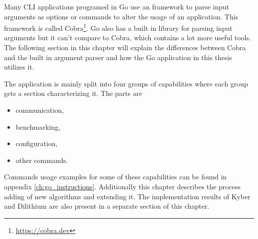 Many CLI applications programed in Go use an framework to parse input arguments as options or commands to alter the usage of an application. This framework is called Cobra\footnote{\url{https://cobra.dev}}. Go also has a built in library for parsing input arguments but it can't compare to Cobra, which contains a lot more useful tools. The following section in this chapter will explain the differences between Cobra and the built in argument parser and how the Go application in this thesis utilizes it.

The application is mainly split into four groups of capabilities where each group gets a section characterizing it. The parts are
\begin{itemize}
  \item communication,
  \item benchmarking,
  \item configuration,
  \item other commands.
\end{itemize}
\noindent Commands usage examples for some of these capabilities can be found in appendix \ref{ch:go_instructions}. Additionally this chapter describes the process adding of new algorithms and extending it. The implementation results of Kyber and Dilithium are also present in a separate section of this chapter.
